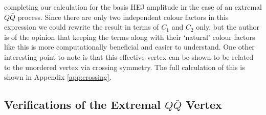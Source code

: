 completing our calculation for the basis HEJ amplitude in the case of an extremal $Q \bar{Q}$ process. Since there are only two independent colour factors in this expression we could rewrite the result in terms of $C_1$ and $C_2$ only, but the author is of the opinion that keeping the terms along with their `natural' colour factors like this is more computationally beneficial and easier to understand. One other interesting point to note is that this effective vertex can be shown to be related to the unordered vertex via crossing symmetry. The full calculation of this is shown in Appendix \ref{app:crossing}. 

\subsection{Verifications of the Extremal $Q\bar{Q}$ Vertex}

